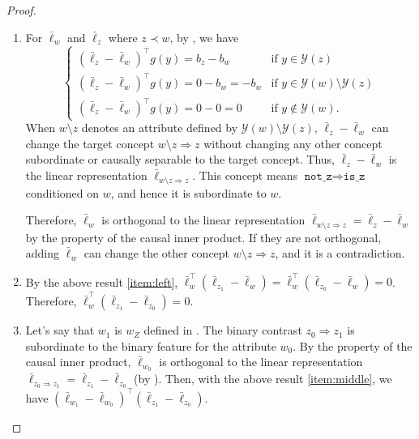 \documentclass{article}
\newcommand{\ConceptValue}[1]{\texttt{#1}}
\newcommand{\ConceptDirMath}[2]{#1 \Rightarrow #2}
\newcommand{\yquad}{\mathcal{Y}}
\begin{document}
\begin{proof}
  \begin{enumerate}[label=(\alph*)]
    \item For $\bar\ell_{w}$ and $\bar\ell_{z}$ where $z \prec w$, by , we have
    \begin{equation}
      \begin{cases}
        (\bar\ell_{z} - \bar\ell_{w})^\top g(y) = b_z - b_w & \text{if } y\in \yquad(z)\\
        (\bar\ell_{z} - \bar\ell_{w})^\top g(y) =  0 -b_w =  -b_w & \text{if } y \in \yquad(w)\setminus \yquad(z)\\
        (\bar\ell_{z} - \bar\ell_{w})^\top g(y) = 0 - 0 = 0 & \text{if } y\not\in \yquad(w).
      \end{cases}
    \end{equation}
    When $w\setminus z$ denotes an attribute defined by $\yquad(w)\setminus \yquad(z)$, $\bar\ell_{z} - \bar\ell_{w}$ can change the target concept $\ConceptDirMath{w\setminus z}{z}$ without changing any other concept subordinate or causally separable to the target concept.
    Thus, $\bar\ell_{z} - \bar\ell_{w}$ is the linear representation $\bar{\ell}_{w\setminus z \Rightarrow z}$.
    This concept means $\ConceptValue{not\_z}  \Rightarrow \ConceptValue{is\_z}$ conditioned on $w$, and hence it is subordinate to $w$.
    
    Therefore, $\bar\ell_w$ is orthogonal to the linear representation $\bar{\ell}_{w\setminus z \Rightarrow z} = \bar\ell_z - \bar\ell_w$ by the property of the causal inner product.
    If they are not orthogonal, adding $\bar\ell_w$ can change the other concept $\ConceptDirMath{w\setminus z}{z}$, and it is a contradiction.

    \item By the above result \ref{item:left}, $\bar\ell_w^\top (\bar\ell_{z_1} - \bar\ell_w) = \bar\ell_w^\top (\bar\ell_{z_0} - \bar\ell_w) = 0$.
    Therefore, $\bar\ell_w^\top (\bar\ell_{z_1} - \bar\ell_{z_0}) = 0$.

    \item Let's say that $w_1$ is $w_Z$ defined in .
    The binary contrast $\ConceptDirMath{z_0}{z_1}$ is subordinate to the binary feature for the attribute $w_0$.
    By the property of the causal inner product, $\bar\ell_{w_0}$ is orthogonal to the linear representation $\bar{\ell}_{z_0\Rightarrow z_1} = \bar\ell_{z_1} - \bar\ell_{z_0}$ (by ).
    Then, with the above result \ref{item:middle}, we have $(\bar\ell_{w_1} - \bar\ell_{w_0})^\top (\bar\ell_{z_1} - \bar\ell_{z_0})$.


\end{enumerate}
\end{proof}
\end{document}
